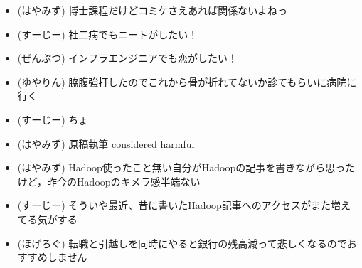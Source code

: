 
%
%

\begin{itemize}
 \item (はやみず) 博士課程だけどコミケさえあれば関係ないよねっ
 \item (すーじー) 社二病でもニートがしたい！
 \item (ぜんぶつ) インフラエンジニアでも恋がしたい！
 \item (ゆやりん) 脇腹強打したのでこれから骨が折れてないか診てもらいに病院に行く
 \item (すーじー) ちょ
 \item (はやみず) 原稿執筆 considered harmful
 \item (はやみず) Hadoop使ったこと無い自分がHadoopの記事を書きながら思ったけど，昨今のHadoopのキメラ感半端ない
 \item (すーじー) そういや最近、昔に書いたHadoop記事へのアクセスがまた増えてる気がする
 \item (ほげろぐ) 転職と引越しを同時にやると銀行の残高減って悲しくなるのでおすすめしません
\end{itemize}
